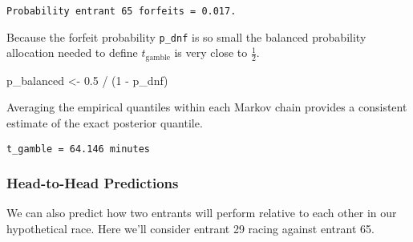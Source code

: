 \documentclass[
  letterpaper,
  DIV=11,
  numbers=noendperiod]{scrartcl}
\newenvironment{Shaded}{\begin{snugshade}}{\end{snugshade}}
\newcommand{\DecValTok}[1]{\textcolor[rgb]{0.68,0.00,0.00}{#1}}
\newcommand{\FloatTok}[1]{\textcolor[rgb]{0.68,0.00,0.00}{#1}}
\newcommand{\FunctionTok}[1]{\textcolor[rgb]{0.28,0.35,0.67}{#1}}
\newcommand{\NormalTok}[1]{\textcolor[rgb]{0.00,0.23,0.31}{#1}}
\newcommand{\OtherTok}[1]{\textcolor[rgb]{0.00,0.23,0.31}{#1}}
\newcommand{\SpecialCharTok}[1]{\textcolor[rgb]{0.37,0.37,0.37}{#1}}
\newcommand{\StringTok}[1]{\textcolor[rgb]{0.13,0.47,0.30}{#1}}
\begin{document}
\begin{verbatim}
Probability entrant 65 forfeits = 0.017.
\end{verbatim}

Because the forfeit probability \texttt{p\_dnf} is so small the balanced
probability allocation needed to define \(t_{\mathrm{gamble}}\) is very
close to \(\frac{1}{2}\).

\begin{Shaded}
\begin{Highlighting}[]
\NormalTok{p\_balanced }\OtherTok{\textless{}{-}} \FloatTok{0.5} \SpecialCharTok{/}\NormalTok{ (}\DecValTok{1} \SpecialCharTok{{-}}\NormalTok{ p\_dnf)}
\end{Highlighting}
\end{Shaded}

Averaging the empirical quantiles within each Markov chain provides a
consistent estimate of the exact posterior quantile.

\begin{Shaded}
\end{Shaded}

\begin{verbatim}
t_gamble = 64.146 minutes
\end{verbatim}

\subsubsection{Head-to-Head Predictions}\label{head-to-head-predictions}

We can also predict how two entrants will perform relative to each other
in our hypothetical race. Here we'll consider entrant 29 racing against
entrant 65.
\end{document}
